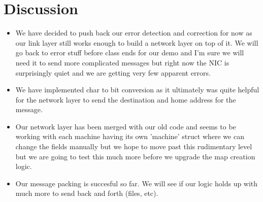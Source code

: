 \documentclass{article}
\begin{document}
\section*{Discussion}
\begin{itemize}
\item We have decided to push back our error detection and correction for now as our link layer still works enough to build a network layer on top of it. We will go back to error stuff before class ends for our demo and I'm sure we will need it to send more complicated messages but right now the NIC is surprisingly quiet and we are getting very few apparent errors. 
\item We have implemented char to bit conversion as it ultimately was quite helpful for the network layer to send the destination and home address for the message. 
\item Our network layer has been merged with our old code and seems to be working with each machine having its own 'machine' struct where we can change the fields manually but we hope to move past this rudimentary level but we are going to test this much more before we upgrade the map creation logic. 
\item Our message packing is succesful so far. We will see if our logic holds up with much more to send back and forth (files, etc).
\end{itemize}
\end{document}
